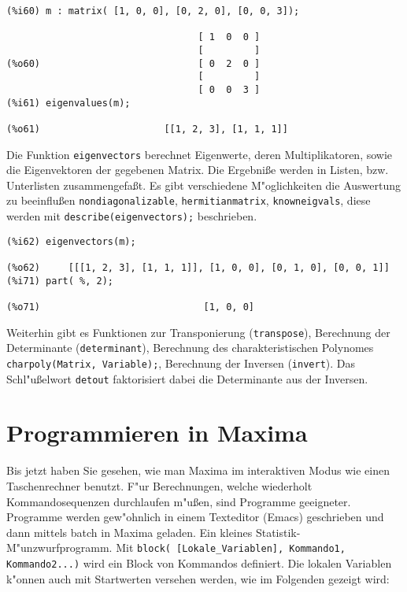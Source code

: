 \documentclass[spanish,12pt,a4paper]{article}
\begin{document}
\scriptsize
\begin{verbatim}
(%i60) m : matrix( [1, 0, 0], [0, 2, 0], [0, 0, 3]);

                                  [ 1  0  0 ]
                                  [         ]
(%o60)                            [ 0  2  0 ]
                                  [         ]
                                  [ 0  0  3 ]
(%i61) eigenvalues(m);

(%o61)                      [[1, 2, 3], [1, 1, 1]]
\end{verbatim}
\normalsize

Die Funktion \verb|eigenvectors| berechnet Eigenwerte, deren Multiplikatoren, sowie die Eigenvektoren der gegebenen Matrix. Die Ergebni{\ss}e werden in Listen, bzw. Unterlisten zusammengefa{\ss}t. Es gibt verschiedene M"oglichkeiten die Auswertung zu beeinflu{\ss}en \verb|nondiagonalizable|, \verb|hermitianmatrix|, \verb|knowneigvals|, diese werden mit \verb|describe(eigenvectors);| beschrieben.

\scriptsize
\begin{verbatim}
(%i62) eigenvectors(m);

(%o62)     [[[1, 2, 3], [1, 1, 1]], [1, 0, 0], [0, 1, 0], [0, 0, 1]]
(%i71) part( %, 2);

(%o71)                             [1, 0, 0]
\end{verbatim}
\normalsize

Weiterhin gibt es Funktionen zur Transponierung (\verb|transpose|), Berechnung der Determinante (\verb|determinant|), Berechnung des charakteristischen Polynomes \verb|charpoly(Matrix, Variable);|, Berechnung der Inversen (\verb|invert|). Das Schl"u{\ss}elwort \verb|detout| faktorisiert dabei die Determinante aus der Inversen.


\section{Programmieren in Maxima}

Bis jetzt haben Sie gesehen, wie man Maxima im interaktiven Modus wie einen Taschenrechner benutzt. F"ur Berechnungen, welche wiederholt Kommandosequenzen durchlaufen m"u{\ss}en, sind Programme geeigneter.
Programme werden gew"ohnlich in einem Texteditor (Emacs) geschrieben und dann mittels batch in Maxima geladen.
Ein kleines Statistik-M"unzwurfprogramm. Mit \verb|block( [Lokale_Variablen], Kommando1, Kommando2...)| wird ein Block von Kommandos definiert. Die lokalen Variablen k"onnen auch mit Startwerten versehen werden, wie im Folgenden gezeigt wird:
\end{document}
